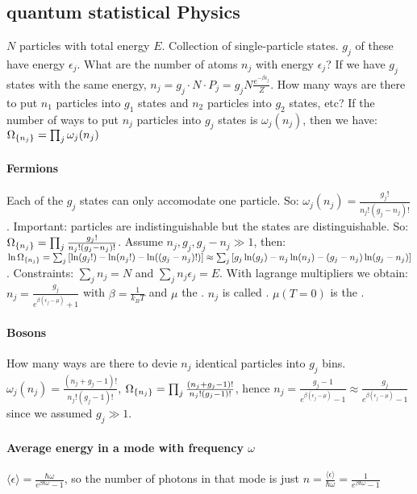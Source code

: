 \subsection{quantum statistical Physics}
$N$ particles with total energy $E$. Collection of single-particle states.
$g_j$ of these have energy $\epsilon_j$. What are the number of atoms $n_j$ with
energy $\epsilon_j$? If we have $g_j$ states with the same energy,
$n_j = g_j \cdot N \cdot P_j = g_j N \frac{e^{-\beta \epsilon_j}}{Z}$.
How many ways are there to put $n_1$ particles into $g_1$ states and
$n_2$ particles into $g_2$ states, etc? If the number of ways to put $n_j$ particles
into $g_j$ states is $\omega_j(n_j)$, then we have:
$\Omega_{\left\{ n_j \right\}} = \prod_j \omega_j(n_j)$

\paragraph{Fermions}
Each of the $g_j$ states can only accomodate one particle. So:
$\omega_j(n_j) = \frac{g_j !}{n_j ! (g_j - n_j)!}$. Important:
particles are indistinguishable but the states are distinguishable. So:
$\Omega_{\left\{ n_j \right\}} = \prod_j \frac{g_j !}{n_j ! (g_j - n_j)!}$.
Assume $n_j , g_j , g_j - n_j \gg 1$, then:
$\ln \Omega_{\left\{ n_j \right\}} = \sum_j \left[ \ln(g_j !) - \ln(n_j !) - \ln((g_j - n_j)!) \right]
\approx \sum_j \left[ g_j \ln(g_j) - n_j \ln(n_j) - (g_j - n_j) \ln(g_j - n_j) \right]$.
Constraints: $\sum_j n_j = N$ and $\sum_j n_j \epsilon_j = E$. With lagrange multipliers
we obtain: $n_j = \frac{g_j}{e^{\beta (\epsilon_j - \mu)} + 1}$ with
$\beta = \frac{1}{k_B T}$ and $\mu$ the .
$n_j$ is called . $\mu(T=0)$ is the .

\paragraph{Bosons}
How many ways are there to devie $n_j$ identical particles into $g_j$ bins.
$\omega_j (n_j) = \frac{(n_j + g_j - 1)!}{n_j ! (g_j - 1)!}$,
$\Omega_{\left\{ n_j \right\}} = \prod_j \frac{(n_j + g_j - 1)!}{n_j ! (g_j - 1)!}$,
hence $n_j = \frac{g_j -1}{e^{\beta(\epsilon_j - \mu)}-1} \approx
\frac{g_j}{e^{\beta(\epsilon_j - \mu)} -1}$ since we assumed $g_j \gg 1$.

\paragraph{Average energy in a mode with frequency $\omega$}
$\langle \epsilon \rangle = \frac{\hbar \omega}{e^{\beta \hbar \omega} - 1}$, so
the number of photons in that mode is just $n = \frac{\langle \epsilon \rangle}{\hbar \omega}
= \frac{1}{e^{\beta \hbar \omega} -1}$

